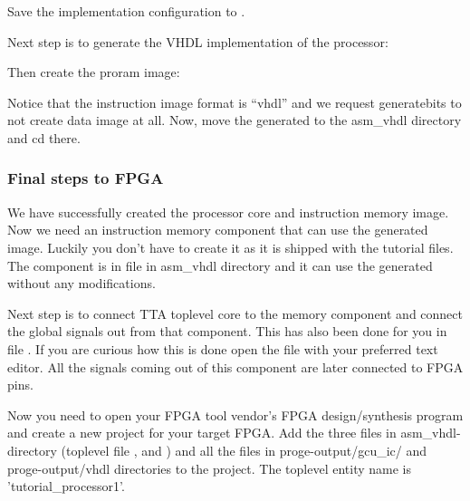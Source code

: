 \documentclass[twoside]{tceusermanual}
\begin{document}
Save the implementation configuration to .


Next step is to generate the VHDL implementation of the processor:



Then create the proram image:



Notice that the instruction image format is ``vhdl'' and we request
generatebits to not create data image at all. Now, move the generated 
 to the asm\_vhdl directory and cd there.



\subsubsection{Final steps to FPGA}
We have successfully created the processor core and instruction memory image.
Now we need an instruction memory component that can use the generated image.
Luckily you don't have to create it as it is shipped with the tutorial files.
The component is in file  in asm\_vhdl directory
and it can use the generated  without any
modifications.

Next step is to connect TTA toplevel core to the memory component and connect
the global signals out from that component. This has also been done for you in
file . If you are curious how this is done
open the file with your preferred text editor. All the signals coming out of
this component are later connected to FPGA pins.

Now you need to open your FPGA tool vendor's FPGA design/synthesis program and
create a new project for your target FPGA. Add the three files in 
asm\_vhdl-directory (toplevel file , 
 and ) and all the
files in proge-output/gcu\_ic/ and proge-output/vhdl directories to the
project. The toplevel entity name is 'tutorial\_processor1'.
\end{document}
